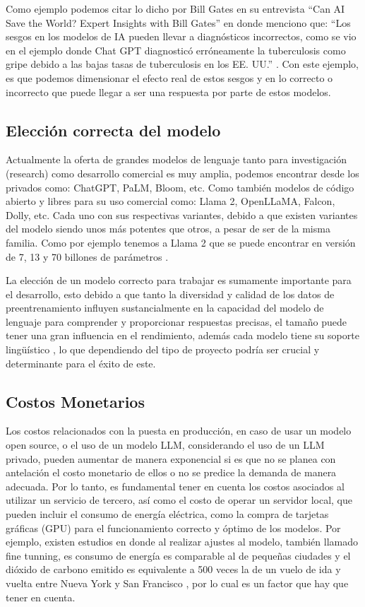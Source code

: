 Como ejemplo podemos citar lo dicho por Bill Gates en su entrevista ``Can AI Save the World? Expert Insights with Bill Gates'' en donde menciono que: 
``Los sesgos en los modelos de IA pueden llevar a diagnósticos incorrectos, como se vio en el ejemplo donde Chat GPT diagnosticó erróneamente la 
tuberculosis como gripe debido a las bajas tasas de tuberculosis en los EE. UU.'' \cite{billgates1}. Con este ejemplo, es que podemos dimensionar el efecto real de estos sesgos y
en lo correcto o incorrecto que puede llegar a ser una respuesta por parte de estos modelos.

\subsection{Elección correcta del modelo}

Actualmente la oferta de grandes modelos de lenguaje tanto para investigación (research) como desarrollo comercial es muy amplia, podemos encontrar desde los privados como: ChatGPT, PaLM, Bloom, etc. 
Como también modelos de código abierto y libres para su uso comercial como: Llama 2, OpenLLaMA, Falcon, Dolly, etc. \cite{modelos2} Cada uno con sus respectivas variantes, debido a que existen 
variantes del modelo siendo unos más potentes que otros, a pesar de ser de la misma familia. Como por ejemplo tenemos a Llama 2 que se puede encontrar en versión de 7, 13 y 70 billones de parámetros \cite{modelos3}. 

La elección de un modelo correcto para trabajar es sumamente importante para el desarrollo, esto debido a que tanto la diversidad y calidad de los datos de preentrenamiento influyen 
sustancialmente en la capacidad del modelo de lenguaje para comprender y proporcionar respuestas precisas, el tamaño puede tener una 
gran influencia en el rendimiento, además cada modelo tiene su soporte lingüístico \cite{modelos1}, lo que dependiendo del tipo de proyecto podría ser crucial y determinante para el éxito de este.  


\subsection{Costos Monetarios}
Los costos relacionados con la puesta en producción, en caso de usar un modelo open source, o el uso de un modelo LLM, considerando el uso de un LLM privado, pueden aumentar de manera exponencial si es que no se planea con antelación el costo monetario de ellos o no se predice la demanda de manera adecuada. Por lo tanto, es fundamental tener en 
cuenta los costos asociados al utilizar un servicio de tercero, así como el costo de operar un servidor local, que pueden incluir el consumo de energía eléctrica, como la compra de tarjetas gráficas (GPU) para el funcionamiento correcto y óptimo de los modelos.
Por ejemplo, existen estudios en donde al realizar ajustes al modelo, también llamado fine tunning, es consumo de energía es comparable al de pequeñas ciudades y el dióxido 
de carbono emitido es equivalente a 500 veces la de un vuelo de ida y vuelta entre Nueva York y San Francisco \cite{ft1}, por lo cual es un factor que hay que tener en cuenta. 


